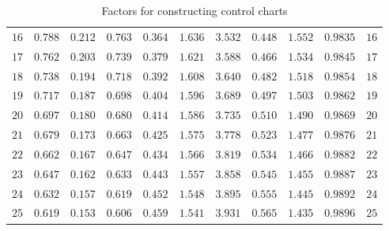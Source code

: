 \documentclass[11pt]{article}
\theoremstyle{definition}
\begin{document}
\begin{table}[H]
\begin{tabularx}{\linewidth}{c | c c c | c c c | c c c | c}
		$16$ & $0.788$ & $0.212$ & $0.763$ & $0.364$ & $1.636$ & $3.532$ & $0.448$ & $1.552$ & $0.9835$ & $16$ \\
		$17$ & $0.762$ & $0.203$ & $0.739$ & $0.379$ & $1.621$ & $3.588$ & $0.466$ & $1.534$ & $0.9845$ & $17$ \\
		$18$ & $0.738$ & $0.194$ & $0.718$ & $0.392$ & $1.608$ & $3.640$ & $0.482$ & $1.518$ & $0.9854$ & $18$ \\
		$19$ & $0.717$ & $0.187$ & $0.698$ & $0.404$ & $1.596$ & $3.689$ & $0.497$ & $1.503$ & $0.9862$ & $19$ \\
		$20$ & $0.697$ & $0.180$ & $0.680$ & $0.414$ & $1.586$ & $3.735$ & $0.510$ & $1.490$ & $0.9869$ & $20$ \\
		$21$ & $0.679$ & $0.173$ & $0.663$ & $0.425$ & $1.575$ & $3.778$ & $0.523$ & $1.477$ & $0.9876$ & $21$ \\
		$22$ & $0.662$ & $0.167$ & $0.647$ & $0.434$ & $1.566$ & $3.819$ & $0.534$ & $1.466$ & $0.9882$ & $22$ \\
		$23$ & $0.647$ & $0.162$ & $0.633$ & $0.443$ & $1.557$ & $3.858$ & $0.545$ & $1.455$ & $0.9887$ & $23$ \\
		$24$ & $0.632$ & $0.157$ & $0.619$ & $0.452$ & $1.548$ & $3.895$ & $0.555$ & $1.445$ & $0.9892$ & $24$ \\
		$25$ & $0.619$ & $0.153$ & $0.606$ & $0.459$ & $1.541$ & $3.931$ & $0.565$ & $1.435$ & $0.9896$ & $25$
	\end{tabularx}
	\caption{Factors for constructing control charts}
	\label{tbl:FactorsControlCharts}
\end{table}
\end{document}
